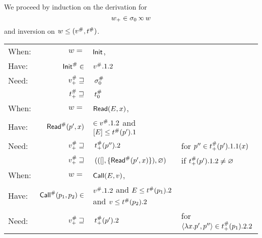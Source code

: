 We proceed by induction on the derivation for
\[w_+\in\ctx_0\semlink w\]
and inversion on $w\le({v}^{\#},{t}^{\#})$.
\begin{center}
	\begin{tabular}{|l@{\hskip2pt}r@{\hskip2pt}l@{\hskip2pt}l|}
		\hline
		When: & $w=$                                & $\textsf{Init}$,                                                                  &                                                              \\
		Have: & ${\textsf{Init}}^{\#}\in$                     & ${v}^{\#}.1.2$                                                              &                                                              \\
		Need: & ${v}^{\#}_+\sqsupseteq$              & $\:{\sigma}^{\#}_0$                                                             &                                                              \\
		      & ${t}^{\#}_+\sqsupseteq$           & $\:{t}^{\#}_0$                                                           &                                                              \\
		\hline
		When: & $w=$                                & $\textsf{Read}(E,x)$,                                                        &                                                              \\
		Have: & ${\textsf{Read}}^{\#}(p',x)$                  & $\in{v}^{\#}.1.2$ and $[E]\le{t}^{\#}(p').1$                         &                                                              \\
		Need: & ${v}^{\#}_+\sqsupseteq$              & $\:{t}^{\#}_+(p'').2$                                                    & for $p''\in{t}^{\#}_+(p').1.1(x)$                          \\
		      & ${v}^{\#}_+\sqsupseteq$              & $\:(([],\{{\textsf{Read}}^{\#}(p',x)\}),\varnothing)$                                & if ${t}^{\#}_+(p').1.2\neq\varnothing$                     \\
		\hline
		When: & $w=$                                & $\textsf{Call}(E,v)$,                                                        &                                                              \\
		Have: & ${\textsf{Call}}^{\#}(p_1,p_2)\in$            & ${v}^{\#}.1.2$ and $E\le{t}^{\#}(p_1).2$ and $v\le{t}^{\#}(p_2).2$ &                                                              \\
		Need: & ${v}^{\#}_+\sqsupseteq$              & $\:{t}^{\#}_+(p').2$                                                     & for $\langle\lambda x.p',p''\rangle\in{t}^{\#}_+(p_1).2.2$ \\

\end{tabular}
\end{center}
